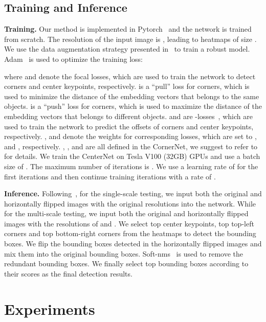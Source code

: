 \documentclass[10pt,twocolumn,letterpaper]{article}
\begin{document}
\subsection{Training and Inference }\label{Training}
\noindent\textbf{Training.} Our method is implemented in Pytorch~\cite{paszke2017automatic} and the network is trained from scratch. The resolution of the input image is , leading to heatmaps of size . We use the data augmentation strategy presented in~\cite{law2018cornernet} to train a robust model. Adam~\cite{kingma2014adam} is used to optimize the training loss:

where  and  denote the focal losses, which are used to train the network to detect corners and center keypoints, respectively.  is a ``pull'' loss for corners, which is used to minimize the distance of the embedding vectors that belongs to the same objects.  is a  ``push'' loss for corners, which is used to maximize the distance of the embedding vectors that belongs to different objects.  and  are -losses~\cite{girshick2015fast}, which are used to train the network to predict the offsets of corners and center keypoints, respectively. ,  and  denote the weights for corresponding losses, which are set to ,  and , respectively. , ,  and  are all defined in the CornerNet, we suggest to refer to~\cite{law2018cornernet} for details. We train the CenterNet on  Tesla V100 (32GB) GPUs and use a batch size of . The maximum number of iterations is . We use a learning rate of  for the first  iterations and then continue training  iterations with a rate of . 

\vspace{1ex}\noindent\textbf{Inference.} Following~\cite{law2018cornernet}, for the single-scale testing, we input both the original and horizontally flipped images with the original resolutions into the network. While for the multi-scale testing, we input both the original and horizontally flipped images with the resolutions of  and . We select top  center keypoints, top  top-left corners and top  bottom-right corners from the heatmaps to detect the bounding boxes. We flip the bounding boxes detected in the horizontally flipped images and mix them into the original bounding boxes. Soft-nms~\cite{bodla2017soft} is used to remove the redundant bounding boxes. We finally select top  bounding boxes according to their scores as the final detection results.
\section{Experiments}
\label{Experiments}
\end{document}
